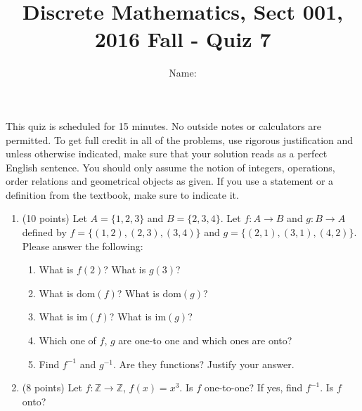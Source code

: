 \documentclass[11pt]{preprint}
\title{Discrete Mathematics, Sect 001, 2016 Fall - Quiz 7}
\author{Name:}
\institute{Courant Institute of Mathematical Sciences, NYU}
\begin{document}
\maketitle

This quiz is scheduled for 15 minutes. No outside notes or calculators are permitted. To get full credit  in all of the problems, use rigorous justification and unless otherwise indicated, make sure that your solution reads as a perfect English sentence. You should only assume the notion of integers, operations, order relations and geometrical objects as given. If you use a statement or a definition from the textbook, make sure to indicate it.
\vspace{0.2cm}

\begin{enumerate}
\item(10 points) Let $A=\{1,2,3\}$ and $B=\{2,3,4\}$. Let $f:A\to B$ and $g:B\to A$ defined by $f=\{(1,2),(2,3),(3,4)\}$ and $g=\{(2,1),(3,1),(4,2)\}$. Please answer the following:
\begin{enumerate}
\item What is $f(2)$? What is $g(3)$?
\item What is $\textrm{dom}(f)$? What is $\textrm{dom}(g)$?
\item What is $\textrm{im}(f)$? What is $\textrm{im}(g)$?
\item Which one of $f$, $g$ are one-to one and which ones are onto?
\item Find $f^{-1}$ and $g^{-1}$. Are they functions? Justify your answer.
\end{enumerate}
\vspace{3cm}
\item (8 points)  Let $f:\mathbb{Z}\to\mathbb{Z}$, $f(x)=x^3$. Is $f$ one-to-one? If yes, find $f^{-1}$. Is $f$ onto? 
\end{enumerate}
\end{document}
